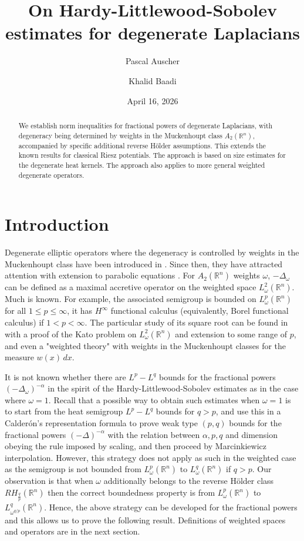 \documentclass[12pt, letterpaper]{amsart}
\author{Pascal Auscher}
\author{Khalid Baadi}
\date{April 16, 2026}
\title[On Hardy-Littlewood-Sobolev estimates for degenerate Laplacians]{On Hardy-Littlewood-Sobolev estimates for degenerate Laplacians}
\theoremstyle{definition}
\theoremstyle{remark}
\numberwithin{equation}{section}
\begin{document}
\begin{abstract}
We establish  norm inequalities for fractional powers of degenerate Laplacians, with degeneracy being determined by weights in the Muckenhoupt class $A_2(\mathbb{R}^n)$, accompanied by specific additional reverse H\"older assumptions. This extends the known results for classical Riesz potentials. The approach is based on size estimates for the degenerate heat kernels. The approach also applies to more general weighted degenerate operators.
\end{abstract}
\maketitle

\tableofcontents




\section{Introduction}\label{section 1}

Degenerate elliptic operators  where the degeneracy is controlled by weights in the Muckenhoupt class  have been introduced in \cite{MR643158}. Since then, they have attracted attention with extension to parabolic equations \cite{MR772255,MR748366, MR799906, MR1711391}. For $A_2(\mathbb{R}^n)$ weights $\omega$, $-\Delta_\omega$ can be defined as  a maximal accretive operator on the weighted space $L^2_\omega(\mathbb{R}^n)$.  Much is known. For example, the associated semigroup  is bounded on $L^p_\omega(\mathbb{R}^n)$ for all $1\le p \le \infty$, it  has $H^\infty$ functional calculus (equivalently, Borel functional calculus) if $1<p<\infty$.  The particular study of its square root can be found in   \cite{cruz2015kato, cruz2017kato} with a proof of the Kato problem on $L^2_\omega(\mathbb{R}^n)$ and extension to some range of $p$, and even a "weighted theory" with weights in the Muckenhoupt classes for the measure $w(x)\, dx$.

It is not known whether there are $L^p-L^q$ bounds for the fractional powers $(-\Delta_\omega)^{-\alpha}$ in the spirit of the Hardy-Littlewood-Sobolev estimates as in the case where $\omega=1$. Recall that a possible way to obtain such estimates when $\omega=1$ is to start from  the heat semigroup $L^p-L^q$ bounds for  $q>p$, and use this in a Calder\'on's representation formula to prove  weak type $(p,q)$ bounds for the fractional powers $(-\Delta)^{-\alpha}$ with the relation between $\alpha, p, q$ and dimension obeying the rule imposed by scaling, and then proceed by Marcinkiewicz interpolation.  However, this strategy does not apply as such in the weighted case as the semigroup is not bounded from $L^p_\omega(\mathbb{R}^n)$ to $L^q_\omega(\mathbb{R}^n)$ if $q>p$. Our observation is that when $\omega$ additionally belongs to the reverse H\"older class $RH_{\frac{q}{p}}(\mathbb{R}^n)$ then the correct boundedness property is from  $L^p_\omega(\mathbb{R}^n)$ to $L^q_{{\omega}^{q/p}}(\mathbb{R}^n)$. Hence, the above strategy can be developed for the fractional powers and this allows us to prove the following result.  Definitions of weighted spaces and operators are in the next section. 
 
\end{document}
